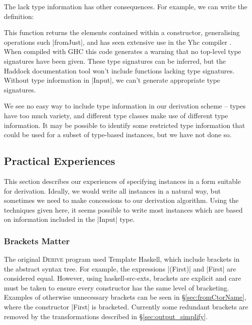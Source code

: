 \documentclass{llncs}
\newcommand{\derive}{\textsc{Derive}}
\begin{document}
The lack type information has other consequences. For example, we can write the definition:


\noindent This function returns the elements contained within a constructor, generalising operations such |fromJust|, and has seen extensive use in the Yhc compiler \cite{yhc}. When compiled with GHC this code generates a warning that no top-level type signatures have been given. These type signatures can be inferred, but the Haddock documentation tool \cite{haddock} won't include functions lacking type signatures. Without type information in |Input|, we can't generate appropriate type signatures.

We see no easy way to include type information in our derivation scheme -- types have too much variety, and different type classes make use of different type information. It may be possible to identify some restricted type information that could be used for a subset of type-based instances, but we have not done so.

\subsection{Practical Experiences}

This section describes our experiences of specifying instances in a form suitable for derivation. Ideally, we would write all instances in a natural way, but sometimes we need to make concessions to our derivation algorithm. Using the techniques given here, it seems possible to write most instances which are based on information included in the |Input| type.

\subsubsection{Brackets Matter}

The original \derive{} program used Template Haskell, which include brackets in the abstract syntax tree. For example, the expressions |(First)| and |First| are considered equal. However, using haskell-src-exts, brackets are explicit and care must be taken to ensure every constructor has the same level of bracketing. Examples of otherwise unnecessary brackets can be seen in \S\ref{sec:fromCtorName}, where the constructor |First| is bracketed. Currently some redundant brackets are removed by the transformations described in \S\ref{sec:output_simplify}.
\end{document}
